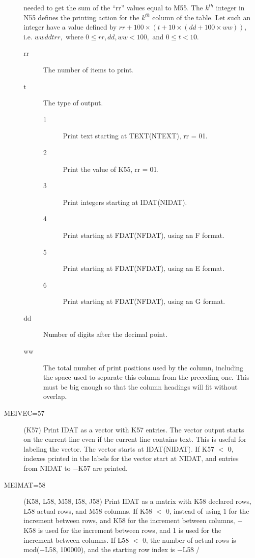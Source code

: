 \documentclass[twoside]{MATH77}
\begin{document}
\begin{description}
  needed to get the sum of the ``rr'' values equal to M55.  The
  $k^{th}$ integer in N55 defines the printing action for the $k^{th}$
  column of the table.  Let such an integer have a value defined by
  $rr + 100 \times (t + 10 \times (dd + 100 \times ww)),$ i.e.
  $wwddtrr,$ where $0 \leq rr,dd,ww < 100,$ and $0 \leq t < 10.$
\begin{description}
\item[rr] The number of items to print.
\item[t] The type of output.
\begin{description}
\item[1]  Print text starting at TEXT(NTEXT), rr = 01.
\item[2]  Print the value of K55, rr = 01.
\item[3]  Print integers starting at IDAT(NIDAT).
\item[4]  Print starting at FDAT(NFDAT), using an F format.
\item[5]  Print starting at FDAT(NFDAT), using an E format.
\item[6]  Print starting at FDAT(NFDAT), using an G format.
\end{description}
\item[dd]   Number of digits after the decimal point.
\item[ww]   The total number of print positions used by the column,
           including the space used to separate this column from the
           preceding one.  This must be big enough so that the column
           headings will fit without overlap.
\end{description}
\item[MEIVEC=57]  (K57) Print IDAT as a vector with K57 entries.  The vector
           output starts on the current line even if the current line
           contains text.  This is useful for labeling the vector.
           The vector starts at IDAT(NIDAT).
           If K57 $<$ 0,  indexes printed in the labels for the vector
           start at NIDAT, and entries from NIDAT to $-$K57 are
           printed.
\item[MEIMAT=58]  (K58, L58, M58, I58, J58) Print IDAT as a matrix with K58
           declared rows, L58 actual rows, and M58 columns.  If K58 $<$ 0,
           instead of using 1 for the increment between rows, and K58
           for the increment between columns, $-$K58 is used for the
           increment between rows, and 1 is used for the increment
           between columns.  If L58 $<$ 0, the number of actual rows is
           mod($-$L58, 100000), and the starting row index is $-$L58 /

\end{description}
\end{document}
